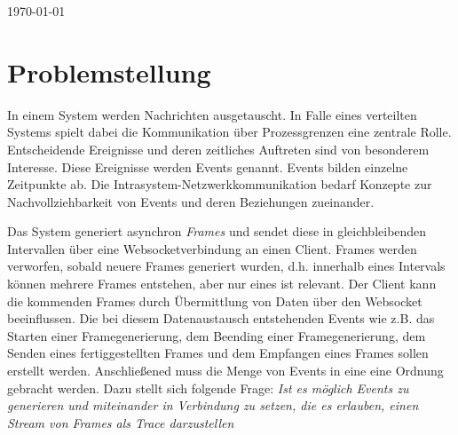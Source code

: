 \documentclass[a4paper]{article}
\begin{document}
\begin{titlepage}
	
	\vfill\vfill\vfill %
	
	{\large \today} %
	
	
	\vfill\vfill
	
	
	\vfill %
	
\end{titlepage}

\tableofcontents
\newpage
{}

\section{Problemstellung}
	In einem System werden Nachrichten ausgetauscht. In Falle eines verteilten Systems spielt dabei die Kommunikation über Prozessgrenzen eine zentrale Rolle.
	Entscheidende Ereignisse und deren zeitliches Auftreten sind von besonderem Interesse. Diese Ereignisse werden Events genannt. Events bilden einzelne Zeitpunkte ab. Die Intrasystem-Netzwerkkommunikation bedarf Konzepte zur Nachvollziehbarkeit von Events und deren Beziehungen zueinander. 
	
	Das System generiert asynchron \emph{Frames} und sendet diese in gleichbleibenden Intervallen über eine Websocketverbindung an einen Client. Frames werden verworfen, sobald neuere Frames generiert wurden, d.h. innerhalb eines Intervals können mehrere Frames entstehen, aber nur eines ist relevant. Der Client kann die kommenden Frames durch Übermittlung von Daten über den Websocket beeinflussen. Die bei diesem Datenaustausch entstehenden Events wie z.B. das Starten einer Framegenerierung, dem Beending einer Framegenerierung, dem Senden eines fertiggestellten Frames und dem Empfangen eines Frames sollen erstellt werden. Anschließened muss die Menge von Events in eine eine Ordnung gebracht werden. Dazu stellt sich folgende Frage: \emph{Ist es möglich Events zu generieren und miteinander in Verbindung zu setzen, die es erlauben, einen Stream von Frames als Trace darzustellen}
\end{document}
